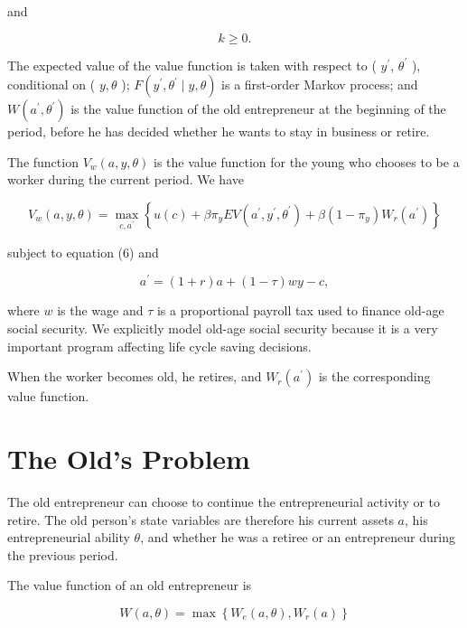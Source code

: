 \documentclass[10pt]{article}
\begin{document}
and


\begin{equation*}
k \geq 0 . \tag{7}
\end{equation*}


The expected value of the value function is taken with respect to ( $y^{\prime}$, $\theta^{\prime}$ ), conditional on ( $y, \theta$ ); $F\left(y^{\prime}, \theta^{\prime} \mid y, \theta\right)$ is a first-order Markov process; and $W\left(a^{\prime}, \theta^{\prime}\right)$ is the value function of the old entrepreneur at the beginning of the period, before he has decided whether he wants to stay in business or retire.

The function $V_{w}(a, y, \theta)$ is the value function for the young who chooses to be a worker during the current period. We have


\begin{equation*}
V_{w}(a, y, \theta)=\max _{c, a^{\prime}}\left\{u(c)+\beta \pi_{y} E V\left(a^{\prime}, y^{\prime}, \theta^{\prime}\right)+\beta\left(1-\pi_{y}\right) W_{r}\left(a^{\prime}\right)\right\} \tag{8}
\end{equation*}


subject to equation (6) and


\begin{equation*}
a^{\prime}=(1+r) a+(1-\tau) w y-c, \tag{9}
\end{equation*}


where $w$ is the wage and $\tau$ is a proportional payroll tax used to finance old-age social security. We explicitly model old-age social security because it is a very important program affecting life cycle saving decisions.

When the worker becomes old, he retires, and $W_{r}\left(a^{\prime}\right)$ is the corresponding value function.

\section*{The Old's Problem}
The old entrepreneur can choose to continue the entrepreneurial activity or to retire. The old person's state variables are therefore his current assets $a$, his entrepreneurial ability $\theta$, and whether he was a retiree or an entrepreneur during the previous period.

The value function of an old entrepreneur is


\begin{equation*}
W(a, \theta)=\max \left\{W_{e}(a, \theta), W_{r}(a)\right\} \tag{10}
\end{equation*}
\end{document}

